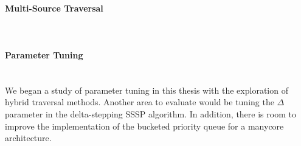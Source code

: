  \paragraph{Multi-Source Traversal}\mbox{}\\

\paragraph{Parameter Tuning}\mbox{}\\
We began a study of parameter tuning in this thesis with the exploration of hybrid traversal methods. 
Another area to evaluate would be tuning the $\Delta$ parameter in the delta-stepping SSSP algorithm.
In addition, there is room to improve the implementation of the bucketed priority queue for a manycore architecture.